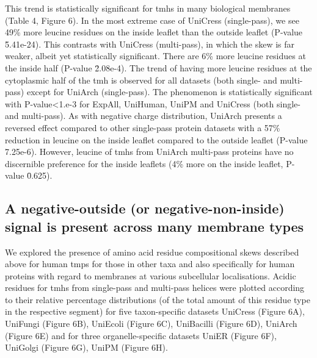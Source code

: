 This trend is statistically significant for \gls{tmh}s in many biological membranes (Table 4, Figure 6). In the most extreme case of UniCress (single-pass), we see 49\% more leucine residues on the inside leaflet than the outside leaflet (P-value \= 5.41e-24). This contrasts with UniCress (multi-pass), in which the skew is far weaker, albeit yet statistically significant. There are 6\% more leucine residues at the inside half (P-value \= 2.08e-4). The trend of having more leucine residues at the cytoplasmic half of the \gls{tmh} is observed for all datasets (both single- and multi-pass) except for UniArch (single-pass). The phenomenon is statistically significant with P-value<1.e-3 for ExpAll, UniHuman, UniPM and UniCress (both single- and multi-pass). As with negative charge distribution, UniArch presents a reversed effect compared to other single-pass protein datasets with a 57\% reduction in leucine on the inside leaflet compared to the outside leaflet (P-value \= 7.25e-6). However, leucine of \gls{tmh}s from UniArch multi-pass proteins have no discernible preference for the inside leaflets (4\% more on the inside leaflet, P-value \= 0.625).

\subsection{A negative-outside (or negative-non-inside) signal is present across many membrane types}

We explored the presence of amino acid residue compositional skews described above for human \gls{tmp}s for those in other taxa and also specifically for human proteins with regard to membranes at various subcellular localisations. Acidic residues for \gls{tmh}s from single-pass and multi-pass helices were plotted according to their relative percentage distributions (of the total amount of this residue type in the respective segment) for five taxon-specific datasets UniCress (Figure 6A), UniFungi (Figure 6B), UniEcoli (Figure 6C), UniBacilli (Figure 6D), UniArch (Figure 6E) and for three organelle-specific datasets UniER (Figure 6F), UniGolgi (Figure 6G), UniPM (Figure 6H).

